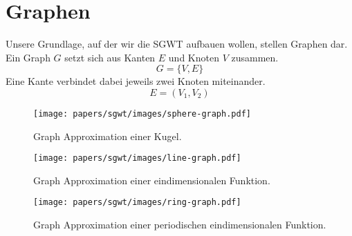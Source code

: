
\section{Graphen\label{sec:sgwt:graphs}}

Unsere Grundlage, auf der wir die SGWT aufbauen wollen, stellen Graphen dar. 
Ein Graph $G$ setzt sich aus Kanten $E$ und Knoten $V$ zusammen.
\begin{equation*}
G = \{V, E\}
\end{equation*}
Eine Kante verbindet dabei jeweils zwei Knoten miteinander.
\begin{equation*}
E = (V_1, V_2)
\end{equation*}

\begin{figure}
    \centering
    \texttt{[image: papers/sgwt/images/sphere-graph.pdf]}
    \caption{Graph Approximation einer Kugel. \label{sgwt:sphere:graph}}
\end{figure}

\begin{figure}
    \centering
    \texttt{[image: papers/sgwt/images/line-graph.pdf]}
    \vspace{-200pt}
    \caption{Graph Approximation einer eindimensionalen Funktion. 
    \label{sgwt:line:graph}}
\end{figure}

\begin{figure}
    \centering
    \texttt{[image: papers/sgwt/images/ring-graph.pdf]}
    \caption{Graph Approximation einer periodischen eindimensionalen Funktion. 
    \label{sgwt:ring:graph}}
\end{figure}

